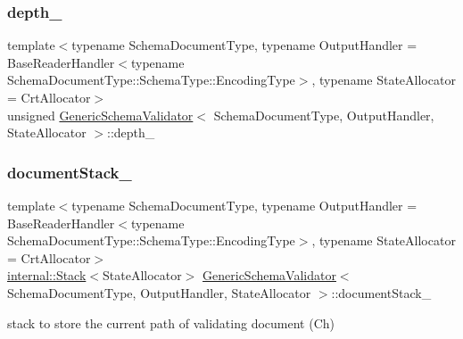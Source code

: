 \mbox{\label{classGenericSchemaValidator_ac90e249c2d8d5e68631e3f8ce44b15fe}} 
\subsubsection{\texorpdfstring{depth\+\_\+}{depth\_}}
{\footnotesize\ttfamily template$<$typename Schema\+Document\+Type, typename Output\+Handler = Base\+Reader\+Handler$<$typename Schema\+Document\+Type\+::\+Schema\+Type\+::\+Encoding\+Type$>$, typename State\+Allocator = Crt\+Allocator$>$ \\
unsigned \hyperlink{classGenericSchemaValidator}{Generic\+Schema\+Validator}$<$ Schema\+Document\+Type, Output\+Handler, State\+Allocator $>$\+::depth\+\_\+\hspace{0.3cm}{\ttfamily [private]}}

\mbox{\label{classGenericSchemaValidator_a98a99734991555b5458398b01f0cce44}} 
\subsubsection{\texorpdfstring{document\+Stack\+\_\+}{documentStack\_}}
{\footnotesize\ttfamily template$<$typename Schema\+Document\+Type, typename Output\+Handler = Base\+Reader\+Handler$<$typename Schema\+Document\+Type\+::\+Schema\+Type\+::\+Encoding\+Type$>$, typename State\+Allocator = Crt\+Allocator$>$ \\
\hyperlink{classinternal_1_1Stack}{internal\+::\+Stack}$<$State\+Allocator$>$ \hyperlink{classGenericSchemaValidator}{Generic\+Schema\+Validator}$<$ Schema\+Document\+Type, Output\+Handler, State\+Allocator $>$\+::document\+Stack\+\_\+\hspace{0.3cm}{\ttfamily [private]}}



stack to store the current path of validating document (Ch) 

\mbox{\label{classGenericSchemaValidator_a9c3e6efc65a62225a83ae9d0f377c074}} 
